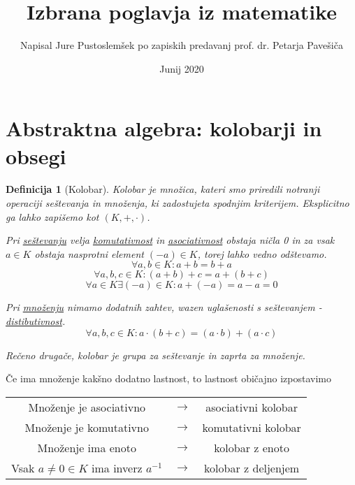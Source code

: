 \documentclass[11pt, a4paper]{article}
\begin{document}
    \newtheorem{theorem}{Izrek}[subsection]
    \newtheorem{definition}[theorem]{Definicija}
    \newtheorem{corollary}[theorem]{Posledica}
    \newtheorem{lemma}[theorem]{Lema}
    \newtheorem{proposition}[theorem]{Trditev}
    \newtheorem{example}[theorem]{Zgled}

    \newtheorem*{remark}{Opomba}


    \title{Izbrana poglavja iz matematike}
    \author{Napisal Jure Pustoslemšek po zapiskih predavanj prof. dr. Petarja Pavešiča}
    \date{Junij 2020}
    \maketitle

    \section{Abstraktna algebra: kolobarji in obsegi}

    \begin{definition}[Kolobar]
        Kolobar je množica, kateri smo priredili notranji operaciji seštevanja in množenja, ki zadostujeta spodnjim kriterijem. Eksplicitno ga lahko zapišemo kot \((K,+,\cdot)\).
        \par
        Pri \underline{seštevanju} velja \underline{komutativnost} in \underline{asociativnost} obstaja ničla 0 in za vsak \(a \in K\) obstaja nasprotni element \((-a) \in K\), torej lahko vedno odštevamo.
        \[\forall a,b \in K: a + b = b + a\]
        \[\forall a,b,c \in K: (a + b) + c = a + (b + c)\]
        \[\forall a \in K \exists (-a) \in K: a + (-a) = a - a = 0\]
        
        \par
        Pri \underline{množenju} nimamo dodatnih zahtev, wazen uglašenosti s seštevanjem - \underline{distibutivnost}.
        \[\forall a,b,c \in K: a \cdot (b+c) = (a \cdot b) + (a \cdot c)\]

        Rečeno drugače, kolobar je grupa za seštevanje in zaprta za množenje.
    \end{definition}

    Če ima množenje kakšno dodatno lastnost, to lastnost običajno izpostavimo\
    \begin{center}
        \begin{tabular}{ c c c }
            Množenje je asociativno & \(\rightarrow\) & asociativni kolobar \\
            Množenje je komutativno & \(\rightarrow\) & komutativni kolobar \\
            Množenje ima enoto & \(\rightarrow\) & kolobar z enoto \\
            Vsak \(a \neq 0 \in K\) ima inverz \(a^{-1}\) & \(\rightarrow\) & kolobar z deljenjem
        \end{tabular}        
    \end{center}
\end{document}
